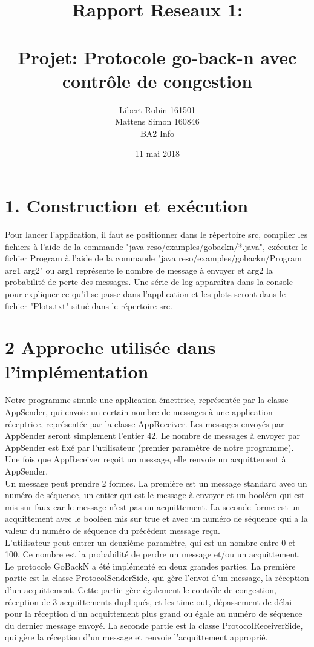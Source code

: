 \documentclass{report}
\title{Rapport Reseaux 1: \\ \\ Projet: Protocole go-back-n avec contrôle de congestion}
\author{Libert Robin 161501\\ Mattens Simon 160846 \\ BA2 Info}
\date{11 mai 2018}
\begin{document}
\maketitle
\section*{1. Construction et exécution}
\hspace*{0,5cm} Pour lancer l'application, il faut se positionner dans le répertoire src, compiler les fichiers à l'aide de la commande "java reso/examples/gobackn/*.java", exécuter le fichier Program à l'aide de la commande "java reso/examples/gobackn/Program arg1 arg2" ou arg1 représente le nombre de message à envoyer et arg2 la probabilité de perte des messages. Une série de log apparaîtra dans la console pour expliquer ce qu'il se passe dans l'application et les plots seront dans le fichier "Plots.txt" situé dans le répertoire src.

\section*{2 Approche utilisée dans l'implémentation}

Notre programme simule une application émettrice, représentée par la classe AppSender, qui envoie un certain nombre de messages à une application réceptrice, représentée par la classe AppReceiver.
Les messages envoyés par AppSender seront simplement l'entier 42. Le nombre de messages à envoyer par AppSender est fixé par l'utilisateur (premier paramètre de notre programme). Une fois que 
AppReceiver reçoit un message, elle renvoie un acquittement à AppSender.\\

Un message peut prendre 2 formes. La première est un message standard avec un numéro de séquence, un entier qui est le message à envoyer et un booléen qui est mis sur faux car le message n'est pas un acquittement. La seconde forme est un acquittement avec le booléen mis sur true et avec un numéro de séquence qui a la valeur du numéro de séquence du précédent message reçu.\\

L'utilisateur peut entrer un deuxième paramètre, qui est un nombre entre 0 et 100. Ce nombre est la probabilité de perdre un message et/ou un acquittement.\\

Le protocole GoBackN a été implémenté en deux grandes parties. La première partie est la classe ProtocolSenderSide, qui gère l'envoi d'un message, la réception d'un acquittement. 
Cette partie gère également le contrôle de congestion, réception de 3 acquittements dupliqués, et les time out, dépassement de délai pour la réception d'un acquittement plus grand ou égale 
au numéro de séquence du dernier message envoyé. La seconde partie est la classe ProtocolReceiverSide, qui gère la réception d'un message et renvoie l'acquittement approprié.\\
\end{document}
